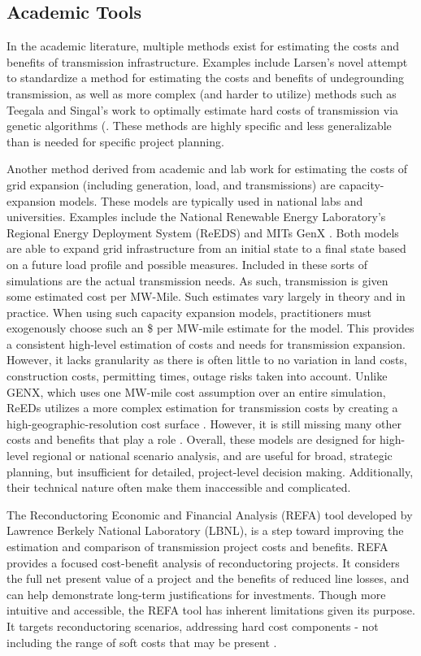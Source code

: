 \documentclass[11pt,twocolumn,a4paper]{article}
\begin{document}
\subsection{Academic Tools}
In the academic literature, multiple methods exist for estimating the costs and benefits of transmission infrastructure. Examples include Larsen's novel attempt to standardize a method for estimating the costs and benefits of undegrounding transmission, as well as more complex (and harder to utilize) methods such as Teegala and Singal's work to optimally estimate hard costs of transmission via genetic algorithms (\parencite{Larsen2016, TeegalaSingal2016}. These methods are highly specific and less generalizable than is needed for specific project planning.

Another method derived from academic and lab work for estimating the costs of grid expansion (including generation, load, and transmissions) are capacity-expansion models. These models are typically used in national labs and universities. Examples include the National Renewable Energy Laboratory's Regional Energy Deployment System (ReEDS) and MITs GenX \parencite{NREL_ReEDS_2019Doc, JenkinsSepulveda2017_GenX}. Both models are able to expand grid infrastructure from an initial state to a final state based on a future load profile and possible measures. Included in these sorts of simulations are the actual transmission needs. As such, transmission is given some estimated cost per MW-Mile. Such estimates vary largely in theory and in practice. When using such capacity expansion models, practitioners must exogenously choose such an \$ per MW-mile estimate for the model. This provides a consistent high-level estimation of costs and needs for transmission expansion. However, it lacks granularity as there is often little to no variation in land costs, construction costs, permitting times, outage risks taken into account.  Unlike GENX, which uses one MW-mile cost assumption over an entire simulation, ReEDs utilizes a more complex estimation for transmission costs by creating a high-geographic-resolution cost surface \parencite{LopezEtAl2025_NREL_TechnicalPotential}. However, it is still missing many other costs and benefits that play a role . Overall, these models are designed for high-level regional or national scenario analysis, and are useful for broad, strategic planning, but insufficient for detailed, project-level decision making. Additionally, their technical nature often make them inaccessible and complicated.

The Reconductoring Economic and Financial Analysis (REFA) tool developed by Lawrence Berkely National Laboratory (LBNL), is a step toward improving the estimation and comparison of transmission project costs and benefits. REFA provides a focused cost-benefit analysis of reconductoring projects. It considers the full net present value of a project and the benefits of reduced line losses, and can help demonstrate long-term justifications for investments. Though more intuitive and accessible, the REFA tool has inherent limitations given its purpose. It targets reconductoring scenarios, addressing hard cost components - not including the range of soft costs that may be present \parencite{LBNL_REFA_Manual_2025}.
\end{document}
